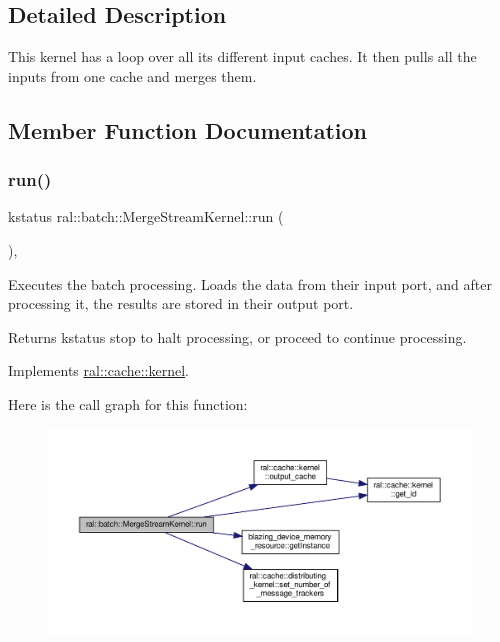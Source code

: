 \subsection{Detailed Description}
This kernel has a loop over all its different input caches. It then pulls all the inputs from one cache and merges them. 

\subsection{Member Function Documentation}
\mbox{\label{classral_1_1batch_1_1MergeStreamKernel_a7d89339b2f4f3adecda2fe64b47948cd}} 
\subsubsection{\texorpdfstring{run()}{run()}}
{\footnotesize\ttfamily kstatus ral\+::batch\+::\+Merge\+Stream\+Kernel\+::run (\begin{DoxyParamCaption}{ }\end{DoxyParamCaption})\hspace{0.3cm}{\ttfamily [override]}, {\ttfamily [virtual]}}



Executes the batch processing. Loads the data from their input port, and after processing it, the results are stored in their output port. 

\begin{DoxyReturn}{Returns}
kstatus \textquotesingle{}stop\textquotesingle{} to halt processing, or \textquotesingle{}proceed\textquotesingle{} to continue processing. 
\end{DoxyReturn}


Implements \hyperlink{classral_1_1cache_1_1kernel_a735b081cccae9574924e74ea6d293ef7}{ral\+::cache\+::kernel}.

Here is the call graph for this function\+:\nopagebreak
\begin{figure}[H]
\begin{center}
\leavevmode
\includegraphics[width=350pt]{classral_1_1batch_1_1MergeStreamKernel_a7d89339b2f4f3adecda2fe64b47948cd_cgraph}
\end{center}
\end{figure}


